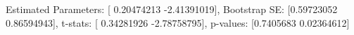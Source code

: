 Estimated Parameters: [ 0.20474213 -2.41391019], Bootstrap SE: [0.59723052 0.86594943], t-stats: [ 0.34281926 -2.78758795], p-values: [0.7405683  0.02364612]